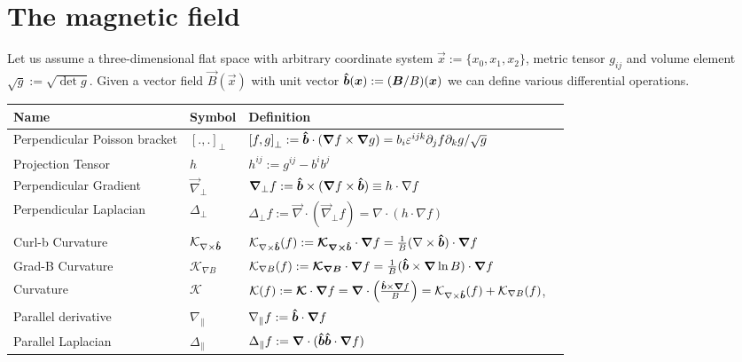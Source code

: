 \section{The magnetic field}\label{sec:magnetic}
Let us assume a three-dimensional flat space with arbitrary coordinate
system $\vec x :=\{x_0, x_1, x_2\}$, metric
tensor $g_{ij}$ and volume element $\sqrt{g} := \sqrt{\det g}$.
Given a vector field $\vec B(\vec x)$ with unit vector $\bm{\hat{b}}({\boldsymbol{x}}) := ({\boldsymbol{B}}/B)({{\boldsymbol{x}}})$
we can define various differential operations.
\begin{longtable}{lll>{\RaggedRight}p{7cm}}
\rowcolor{gray!50}\textbf{Name} &  \textbf{Symbol} & \textbf{Definition} \\
\midrule
    Perpendicular Poisson bracket&
    $\left[.,.\right]_\perp$ &
    $\left[f,g\right]_\perp := \bm{\hat{b}} \cdot \left({\boldsymbol{\nabla}} f \times {\boldsymbol{\nabla}} g\right) =
    b_i \varepsilon^{ijk}\partial_j f\partial_k g/\sqrt{g}$  \\
    Projection Tensor&
    $h $ & $h^{ij} := g^{ij} - b^ib^j $\\
    Perpendicular Gradient&
    $\vec \nabla_\perp $&
    $ {\boldsymbol{\nabla}}_\perp f := \bm{\hat{b}}\times({\boldsymbol{\nabla}} f\times \bm{\hat{b}} ) \equiv
    h \cdot \nabla f$ \\
    Perpendicular Laplacian&
    $\Delta_\perp $&
    $ \Delta_\perp f:= \vec \nabla\cdot (\vec \nabla_\perp f)
    = \nabla\cdot( h\cdot\nabla f)$  \\
    Curl-b Curvature &
    $\mathcal K_{\nabla\times\bm{\hat{b}}}$ &
    $\mathcal K_{\nabla\times\bm{\hat{b}}}(f) := {\boldsymbol{ \mathcal K_{\nabla\times\bm{\hat{b}}} }}\cdot {\boldsymbol{\nabla}} f = \frac{1}{B}(\nabla \times \bm{\hat{b}})\cdot {\boldsymbol{\nabla}} f$ \\
    Grad-B Curvature &
    $\mathcal K_{\nabla B} $ &
    $\mathcal K_{\nabla B}(f) := {\boldsymbol{\mathcal K_{\nabla B}}} \cdot {\boldsymbol{\nabla}} f = \frac{1}{B}(\bm{\hat{b}} \times {\boldsymbol{\nabla}} \ln B)\cdot {\boldsymbol{\nabla}} f$ \\
    Curvature &
    $\mathcal K$ &
    $\mathcal{K}(f):={\boldsymbol{\mathcal K}} \cdot {\boldsymbol{\nabla}} f = {\boldsymbol{\nabla}} \cdot \left(\frac{ \bm{\hat{b}} \times {\boldsymbol{\nabla}} f}{B} \right) = \mathcal K_{\nabla\times\bm{\hat{b}}}(f) + \mathcal K_{\nabla B}(f)$,\\
    Parallel derivative&
    $\nabla_\parallel $&
    $ \nabla_\parallel f := \bm{\hat{b}}\cdot{\boldsymbol{\nabla}} f$ \\
    Parallel Laplacian&
    $\Delta_\parallel $&
    $\Delta_\parallel f:= {\boldsymbol{\nabla}} \cdot ( \bm{\hat{b}}\bm{\hat{b}}\cdot{\boldsymbol{\nabla}} f )$\\
\bottomrule
\end{longtable}
